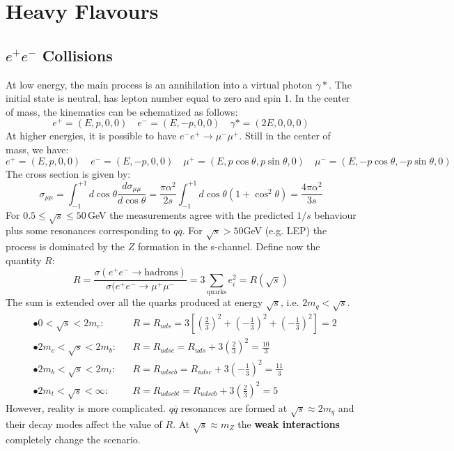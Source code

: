 \documentclass[10.75pt,a4paper,openright,bottom=2cm]{article}
\begin{document}
\section{Heavy Flavours}
\subsection{$e^+e^-$ Collisions}
At low energy, the main process is an annihilation into a virtual photon $\gamma*$. The initial state is neutral, has lepton number equal to zero and spin 1. In the center of mass, the kinematics can be schematized as follows:
\[
e^+=(E,p,0,0) \quad e^-=(E,-p,0,0) \quad \gamma*=(2E,0,0,0)
\]
At higher energies, it is possible to have $e^-e^+\to\mu^-\mu^+$. Still in the center of mass, we have:
\[
e^+=(E,p,0,0) \quad e^-=(E,-p,0,0) \quad \mu^+=(E,p\cos\theta,p\sin\theta,0) \quad \mu^-=(E,-p\cos\theta,-p\sin\theta,0)
\]
The cross section is given by:
\[
\sigma_{\mu\mu}=\int_{-1}^{+1}d\cos\theta\frac{d\sigma_{\mu\mu}}{d\cos\theta}=\frac{\pi\alpha^2}{2s}\int_{-1}^{+1}d\cos\theta(1+\cos^2\theta)=\frac{4\pi\alpha^2}{3s}
\]
For $0.5\le\sqrt{s}\le50$\,GeV the measurements agree with the predicted $1/s$ behaviour plus some resonances corresponding to $q\overline{q}$. For $\sqrt{s}>50$\;GeV (e.g. LEP) the process is dominated by the $Z$ formation in the s-channel. Define now the quantity $R$:
\[
R=\frac{\sigma(e^+e^-\to\text{hadrons})}{\sigma(e^+e^-\to\mu^+\mu^-}=3\sum_{\text{quarks}}e_i^2=R(\sqrt{s})
\]
The sum is extended over all the quarks produced at energy $\sqrt{s}$, i.e. $2m_q<\sqrt{s}$.
\[
\begin{aligned}
&\bullet 0<\sqrt{s}<2m_c: &&R=R_{uds}=3\left[\left(\frac{2}{3}\right)^2+\left(-\frac{1}{3}\right)^2+\left(-\frac{1}{3}\right)^2\right]=2\\
&\bullet 2m_c<\sqrt{s}<2m_b: &&R=R_{udsc}=R_{uds}+3\left(\frac{2}{3}\right)^2=\frac{10}{3}\\
&\bullet 2m_b<\sqrt{s}<2m_t: &&R=R_{udscb}=R_{udsc}+3\left(-\frac{1}{3}\right)^2=\frac{11}{3}\\
&\bullet 2m_t<\sqrt{s}<\infty: &&R=R_{udscbt}=R_{udscb}+3\left(\frac{2}{3}\right)^2=5
\end{aligned}
\]
However, reality is more complicated. $q\overline{q}$ resonances are formed at $\sqrt{s}\approx2m_q$ and their decay modes affect the value of $R$. At $\sqrt{s}\approx m_Z$ the \textbf{weak interactions} completely change the scenario.
\end{document}

